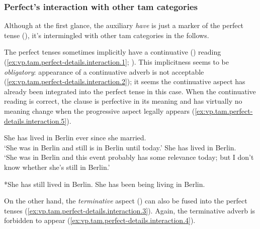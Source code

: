 \documentclass[UTF8, a4paper, oneside, scheme=plain, 12pt]{ctexbook}
\newcommand*{\citepage}[1]{p.~{#1}}
\newcommand{\form}[1]{\emph{#1}}
\newcommand{\translate}[1]{`#1'}
\begin{document}
\subsubsection{Perfect's interaction with other \ac{tam} categories}

Although at the first glance, 
the auxiliary \form{have} is just a marker of the perfect tense
(),
it's intermingled with other \ac{tam} categories in the follows. 

The perfect tenses sometimes implicitly have a continuative () reading
(\ref{ex:vp.tam.perfect-details.interaction.1}; \citealt[\citepage{141}]{cgel}).
This implicitness seems to be \emph{obligatory}:
appearance of a continuative adverb is not acceptable
(\ref{ex:vp.tam.perfect-details.interaction.2});
it seems the continuative aspect has already been integrated 
into the perfect tense in this case.
When the continuative reading is correct,
the clause is perfective in its meaning 
and has virtually no meaning change when the progressive aspect legally appears 
(\ref{ex:vp.tam.perfect-details.interaction.5}). 

\begin{exe}
    \ex\label{ex:vp.tam.perfect-details.interaction.1} \begin{xlist}
        \ex She has lived in Berlin ever since she married. \\ 
        \translate{She was in Berlin and still is in Berlin until today.}
        \ex She has lived in Berlin. \\
        \translate{She was in Berlin and this event probably has some relevance today; 
        but I don't know whether she's still in Berlin.}
    \end{xlist}
    \ex\label{ex:vp.tam.perfect-details.interaction.2} 
    *She has still lived in Berlin.
    \ex\label{ex:vp.tam.perfect-details.interaction.5} 
    She has been being living in Berlin.
\end{exe}

On the other hand, the \emph{terminative} aspect 
()
can also be fused into the perfect tenses
(\ref{ex:vp.tam.perfect-details.interaction.3}).
Again, the terminative adverb is forbidden to appear
(\ref{ex:vp.tam.perfect-details.interaction.4}).
\end{document}
